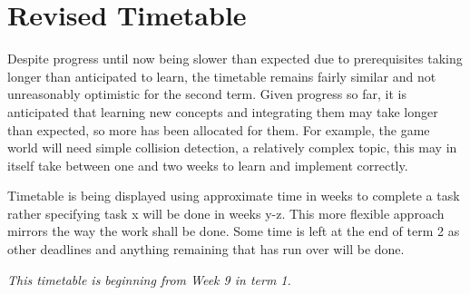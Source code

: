 \documentclass[titlepage]{article}
\begin{document}
\newpage

\section{Revised Timetable}
	
	Despite progress until now being slower than expected due to prerequisites taking longer than anticipated to learn, the timetable remains fairly similar and not unreasonably optimistic for the second term. Given progress so far, it is anticipated that learning new concepts and integrating them may take longer than expected, so more has been allocated for them. For example, the game world will need simple collision detection, a relatively complex topic, this may in itself take between one and two weeks to learn and implement correctly.

	Timetable is being displayed using approximate time in weeks to complete a task rather specifying task x will be done in weeks y-z. This more flexible approach mirrors the way the work shall be done. Some time is left at the end of term 2 as other deadlines and anything remaining that has run over will be done.

	\textit{This timetable is beginning from Week 9 in term 1.}
\end{document}
